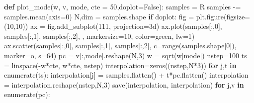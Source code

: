 \documentclass[
]{article}
\newenvironment{Shaded}{}{}
\newcommand{\BuiltInTok}[1]{\textcolor[rgb]{0.00,0.50,0.00}{#1}}
\newcommand{\ControlFlowTok}[1]{\textcolor[rgb]{0.00,0.44,0.13}{\textbf{#1}}}
\newcommand{\DecValTok}[1]{\textcolor[rgb]{0.25,0.63,0.44}{#1}}
\newcommand{\KeywordTok}[1]{\textcolor[rgb]{0.00,0.44,0.13}{\textbf{#1}}}
\newcommand{\NormalTok}[1]{#1}
\newcommand{\OperatorTok}[1]{\textcolor[rgb]{0.40,0.40,0.40}{#1}}
\newcommand{\StringTok}[1]{\textcolor[rgb]{0.25,0.44,0.63}{#1}}
\newcommand{\VariableTok}[1]{\textcolor[rgb]{0.10,0.09,0.49}{#1}}
\begin{document}
\begin{Shaded}
\begin{Highlighting}[]
\KeywordTok{def}\NormalTok{ plot\_mode(w, v, mode, cte }\OperatorTok{=} \DecValTok{50}\NormalTok{,doplot}\OperatorTok{=}\VariableTok{False}\NormalTok{):}
\NormalTok{    samples }\OperatorTok{=}\NormalTok{ R}
\NormalTok{    samples }\OperatorTok{{-}=}\NormalTok{ samples.mean(axis}\OperatorTok{=}\DecValTok{0}\NormalTok{)}
\NormalTok{    N,dim }\OperatorTok{=}\NormalTok{ samples.shape}
    \ControlFlowTok{if}\NormalTok{ doplot:}
\NormalTok{        fig }\OperatorTok{=}\NormalTok{ plt.figure(figsize}\OperatorTok{=}\NormalTok{(}\DecValTok{10}\NormalTok{,}\DecValTok{10}\NormalTok{))}
\NormalTok{        ax }\OperatorTok{=}\NormalTok{ fig.add\_subplot(}\DecValTok{111}\NormalTok{, projection}\OperatorTok{=}\StringTok{\textquotesingle{}3d\textquotesingle{}}\NormalTok{)}
\NormalTok{        ax.plot(samples[:,}\DecValTok{0}\NormalTok{], samples[:,}\DecValTok{1}\NormalTok{], samples[:,}\DecValTok{2}\NormalTok{], }\StringTok{\textquotesingle{}{-}\textquotesingle{}}\NormalTok{, markersize}\OperatorTok{=}\DecValTok{10}\NormalTok{, color}\OperatorTok{=}\StringTok{\textquotesingle{}green\textquotesingle{}}\NormalTok{, lw}\OperatorTok{=}\DecValTok{1}\NormalTok{)}
\NormalTok{        ax.scatter(samples[:,}\DecValTok{0}\NormalTok{], samples[:,}\DecValTok{1}\NormalTok{], samples[:,}\DecValTok{2}\NormalTok{], c}\OperatorTok{=}\BuiltInTok{range}\NormalTok{(samples.shape[}\DecValTok{0}\NormalTok{]), marker}\OperatorTok{=}\StringTok{\textquotesingle{}o\textquotesingle{}}\NormalTok{, s}\OperatorTok{=}\DecValTok{64}\NormalTok{)}
\NormalTok{    pc }\OperatorTok{=}\NormalTok{ v[:,mode].reshape(N,}\DecValTok{3}\NormalTok{)}
\NormalTok{    w }\OperatorTok{=}\NormalTok{ sqrt(w[mode])}
\NormalTok{    nstep}\OperatorTok{=}\DecValTok{100}
\NormalTok{    ts }\OperatorTok{=}\NormalTok{ linspace(}\OperatorTok{{-}}\NormalTok{w}\OperatorTok{*}\NormalTok{cte, w}\OperatorTok{*}\NormalTok{cte, nstep)}
\NormalTok{    interpolation}\OperatorTok{=}\NormalTok{zeros((nstep,N}\OperatorTok{*}\DecValTok{3}\NormalTok{))}
    \ControlFlowTok{for}\NormalTok{ j,t }\KeywordTok{in} \BuiltInTok{enumerate}\NormalTok{(ts):}
\NormalTok{        interpolation[j] }\OperatorTok{=}\NormalTok{ samples.flatten() }\OperatorTok{+}\NormalTok{ t}\OperatorTok{*}\NormalTok{pc.flatten()}
\NormalTok{    interpolation }\OperatorTok{=}\NormalTok{ interpolation.reshape(nstep,N,}\DecValTok{3}\NormalTok{)}
\NormalTok{    save(}\StringTok{\textquotesingle{}interpolation\textquotesingle{}}\NormalTok{, interpolation)}
    \ControlFlowTok{for}\NormalTok{ j,v }\KeywordTok{in} \BuiltInTok{enumerate}\NormalTok{(pc):}

\end{Highlighting}
\end{Shaded}
\end{document}
